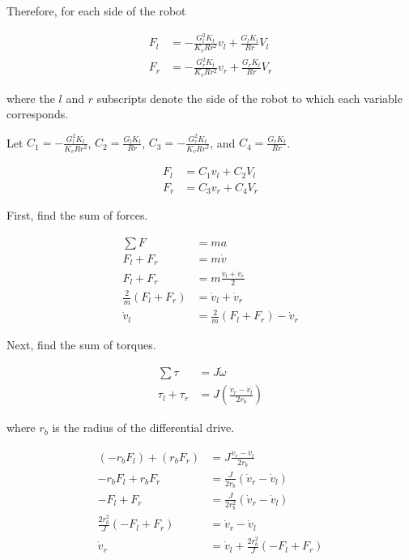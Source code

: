 Therefore, for each side of the robot

\begin{align*}
  F_l &= -\frac{G_l^2 K_t}{K_v R r^2} v_l + \frac{G_l K_t}{Rr} V_l \\
  F_r &= -\frac{G_r^2 K_t}{K_v R r^2} v_r + \frac{G_r K_t}{Rr} V_r
\end{align*}

where the $l$ and $r$ subscripts denote the side of the robot to which each
variable corresponds.

Let $C_1 = -\frac{G_l^2 K_t}{K_v R r^2}$, $C_2 = \frac{G_l K_t}{Rr}$,
$C_3 = -\frac{G_r^2 K_t}{K_v R r^2}$, and $C_4 = \frac{G_r K_t}{Rr}$.

\begin{align}
  F_l &= C_1 v_l + C_2 V_l \label{eq:diff_drive_Fl} \\
  F_r &= C_3 v_r + C_4 V_r \label{eq:diff_drive_Fr}
\end{align}

First, find the sum of forces.

\begin{align}
  \sum F &= ma \nonumber \\
  F_l + F_r &= m \dot{v} \nonumber \\
  F_l + F_r &= m \frac{\dot{v}_l + \dot{v}_r}{2} \nonumber \\
  \frac{2}{m} (F_l + F_r) &= \dot{v}_l + \dot{v}_r \nonumber \\
  \dot{v}_l &= \frac{2}{m} (F_l + F_r) - \dot{v}_r \label{eq:diff_drive_dotv_l}
\end{align}

Next, find the sum of torques.

\begin{align*}
  \sum \tau &= J \dot{\omega} \\
  \tau_l + \tau_r &= J \left(\frac{\dot{v}_r - \dot{v}_l}{2 r_b}\right)
\end{align*}

where $r_b$ is the radius of the differential drive.

\begin{align*}
  (-r_b F_l) + (r_b F_r) &= J \frac{\dot{v}_r - \dot{v}_l}{2 r_b} \\
  -r_b F_l + r_b F_r &= \frac{J}{2 r_b} (\dot{v}_r - \dot{v}_l) \\
  -F_l + F_r &= \frac{J}{2 r_b^2} (\dot{v}_r - \dot{v}_l) \\
  \frac{2 r_b^2}{J} (-F_l + F_r) &= \dot{v}_r - \dot{v}_l \\
  \dot{v}_r &= \dot{v}_l + \frac{2 r_b^2}{J} (-F_l + F_r)
\end{align*}

